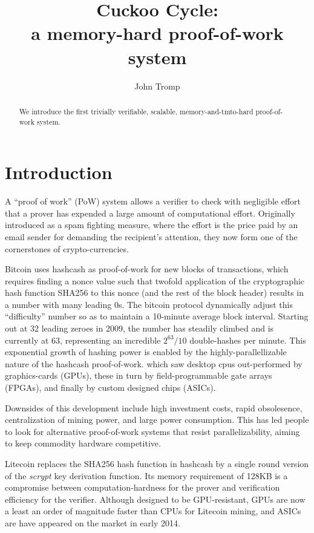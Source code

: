 \documentclass[11pt, oneside]{article}
\title{Cuckoo Cycle: \protect\\ a memory-hard proof-of-work system}
\author{John Tromp}
\begin{document}
\maketitle

\begin{abstract}
We introduce the first trivially verifiable, scalable, memory-and-tmto-hard proof-of-work system.
\end{abstract}

\section{Introduction}
A ``proof of work'' (PoW) system allows a verifier to check with
negligible effort that a prover has expended a large amount of computational effort.
Originally introduced as a spam fighting measure, 
where the effort is the price paid by an email sender for demanding the recipient's attention,
they now form one of the cornerstones of crypto-currencies.

Bitcoin\cite{nakamoto2009bitcoin} uses hashcash\cite{back2002} as proof-of-work for
new blocks of transactions, which requires finding a nonce value such that
twofold application of the cryptographic hash function SHA256
to this nonce (and the rest of the block header) results in a number with many
leading 0s.  The bitcoin protocol dynamically adjust this ``difficulty'' number
so as to maintain a 10-minute average block interval. Starting out at 32 leading zeroes in 2009,
the number has steadily climbed and is currently at 63, representing
an incredible $2^{63}/10$ double-hashes per minute. This exponential growth of hashing power
is enabled by the highly-parallellizable nature of the hashcash proof-of-work.
which saw desktop cpus out-performed by graphics-cards (GPUs),
these in turn by field-programmable gate arrays (FPGAs),
and finally by custom designed chips (ASICs).

Downsides of this development include high investment costs, rapid obsolesence,
centralization of mining power, and large power consumption.
This has led people to look for alternative proof-of-work systems that resist parallelizability,
aiming to keep commodity hardware competitive.

Litecoin replaces the SHA256 hash function in hashcash by a single round version of the
{\em scrypt} key derivation function. Its memory requirement of 128KB is a compromise
between computation-hardness for the prover and verification efficiency for the verifier.
Although designed to be GPU-resistant, GPUs are now a least an order of magnitude faster
than CPUs for Litecoin mining, and ASICs are have appeared on the market in early 2014.
\end{document}
